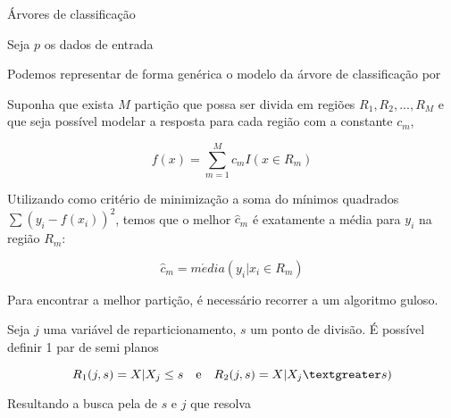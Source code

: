 Árvores de classificação


Seja \begin{math}p\end{math} os dados de entrada

Podemos representar de forma genérica o modelo da árvore de classificação por


Suponha que exista \begin{math}M\end{math} partição que possa ser divida em regiões \begin{math}R_{1}, R_{2}, ..., R_{M} \end{math} e que seja possível modelar a resposta para cada região com a constante \begin{math}c_{m}\end{math}, 

\begin{equation}
f(x) = \sum_{m=1}^{M}c_{m}I( x \in R_{m} )
\end{equation}

Utilizando como critério de minimização a soma do mínimos quadrados \begin{math}\sum{ (y_{i} - f(x_{i}))^{2}}\end{math}, temos que o melhor \begin{math}\hat c_{m}\end{math} é exatamente a média para \begin{math}y_{i}\end{math} na região \begin{math}R_{m}\end{math}:

\begin{equation}
\label{eq:media}
\hat c_{m} = m\acute edia(y_{i} | x_{i} \in R_{m})
\end{equation}

Para encontrar a melhor partição, é necessário recorrer a um algoritmo guloso.

Seja \begin{math}j\end{math} uma variável de reparticionamento, $s$ um ponto de divisão. É possível definir 1 par de semi planos 

\begin{equation}
R_{1}(j,s) = {X | X_{j}\leq s} \quad \textrm{e} \quad R_{2}(j,s) = {X | X_{j}\textgreater s})
\end{equation}

Resultando a busca pela de \begin{math}s\end{math} e \begin{math}j\end{math} que resolva


